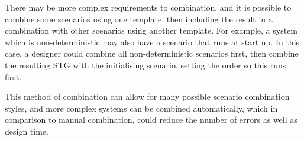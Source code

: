 \documentclass[british,compsoc]{IEEEtran}
\begin{document}
There may be more complex requirements to combination, and it
is possible to combine some scenarios using one template, then including
the result in a combination with other scenarios using another template. For example, a
system which is non-deterministic may also have a scenario that runs
at start up. In this case, a designer could
combine all non-deterministic scenarios first, then combine the resulting
STG with the initialising scenario, setting the order so this runs
first.

This method of combination can allow for many possible scenario combination
styles, and more complex systems can be combined automatically, which
in comparison to manual combination, could reduce the number of errors
as well as design time.

%
%
%
%
\end{document}
